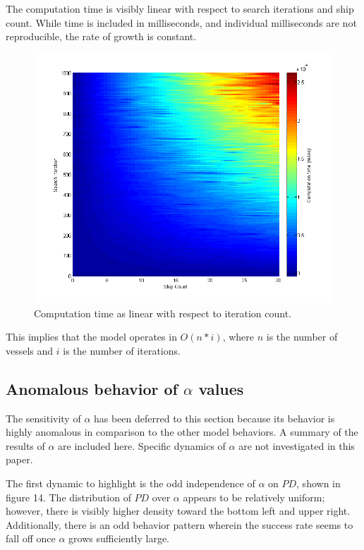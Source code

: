 \documentclass[a4paper]{article}
\begin{document}
The computation time is visibly linear with respect to search iterations and ship count. While time is included in milliseconds, and individual milliseconds are not reproducible, the rate of growth is constant. 

\begin{figure}[H]\begin{center}
\includegraphics[scale=0.6]{../Matlab/Images/CompTimeByItersShips.png}
\caption{Computation time as linear with respect to iteration count.}
\end{center}\end{figure}

This implies that the model operates in $O(n*i)$, where $n$ is the number of vessels and $i$ is the number of iterations.

\subsection{Anomalous behavior of $\alpha$ values}

The sensitivity of $\alpha$ has been deferred to this section because its behavior is highly anomalous in comparison to the other model behaviors. A summary of the results of $\alpha$ are included here. Specific dynamics of $\alpha$ are not investigated in this paper.

The first dynamic to highlight is the odd independence of $\alpha$ on $PD$, shown in figure 14. The distribution of $PD$ over $\alpha$ appears to be relatively uniform; however, there is visibly higher density toward the bottom left and upper right. Additionally, there is an odd behavior pattern wherein the success rate seems to fall off once $\alpha$ grows sufficiently large. 
\end{document}
